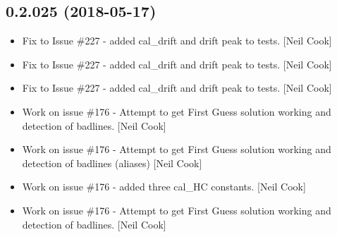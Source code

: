 \documentclass[a4paper,10pt,english]{report}
\begin{document}
\subsection{0.2.025 (2018-05-17)}
\label{\detokenize{misc/changelog:id434}}\begin{itemize}
\item {} 
Fix to Issue \#227 - added cal\_drift and drift peak to tests. {[}Neil
Cook{]}

\item {} 
Fix to Issue \#227 - added cal\_drift and drift peak to tests. {[}Neil
Cook{]}

\item {} 
Fix to Issue \#227 - added cal\_drift and drift peak to tests. {[}Neil
Cook{]}

\item {} 
Work on issue \#176 - Attempt to get First Guess solution working and
detection of badlines. {[}Neil Cook{]}

\item {} 
Work on issue \#176 - Attempt to get First Guess solution working and
detection of badlines (aliases) {[}Neil Cook{]}

\item {} 
Work on issue \#176 - added three cal\_HC constants. {[}Neil Cook{]}

\item {} 
Work on issue \#176 - Attempt to get First Guess solution working and
detection of badlines. {[}Neil Cook{]}

\end{itemize}
\end{document}
